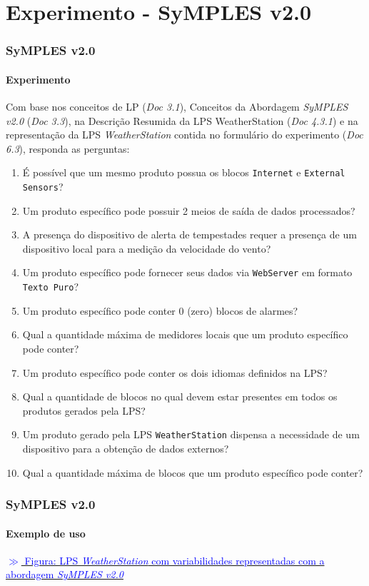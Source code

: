 \section{Experimento - SyMPLES v2.0}

\begin{frame}[allowframebreaks]
\frametitle{SyMPLES v2.0}
\framesubtitle{Experimento}

  Com base nos conceitos de LP (\textit{Doc 3.1}), Conceitos da Abordagem \textit{SyMPLES v2.0} (\textit{Doc 3.3}), na Descrição Resumida da LPS WeatherStation (\textit{Doc 4.3.1}) e na representação da LPS \textit{WeatherStation} contida no formulário do experimento (\textit{Doc 6.3}), responda as perguntas:
  
  \begin{enumerate}
    \item {
      É possível que um mesmo produto possua os blocos \texttt{Internet} e \texttt{External Sensors}?
    }
    \item {
      Um produto específico pode possuir 2 meios de saída de dados processados?
    }
    \item {
      A presença do dispositivo de alerta de tempestades requer a presença de um dispositivo local para a medição da velocidade do vento?
    }
    \item {
      Um produto específico pode fornecer seus dados via \texttt{WebServer} em formato \texttt{Texto Puro}?
    }
    \item {
      Um produto específico pode conter 0 (zero) blocos de alarmes?
    }
    \item {
      Qual a quantidade máxima de medidores locais que um produto específico pode conter?
    }
    \item {
      Um produto específico pode conter os dois idiomas definidos na LPS?
    }
    \item {
      Qual a quantidade de blocos no qual devem estar presentes em todos os produtos gerados pela LPS?
    }
    \item {
      Um produto gerado pela LPS \texttt{WeatherStation} dispensa a necessidade de um dispositivo para a obtenção de dados externos?
    }
    \item {
      Qual a quantidade máxima de blocos que um produto específico pode conter?
    }
  \end{enumerate}

\end{frame}

\begin{frame}
\frametitle{SyMPLES v2.0}
\framesubtitle{Exemplo de uso}

  \href{run:./material/est-met-blocks-cvl.pdf}{\textcolor{blue}{$\gg$ Figura: LPS \textit{WeatherStation} com variabilidades representadas com a abordagem \textit{SyMPLES v2.0}}}

\end{frame}
